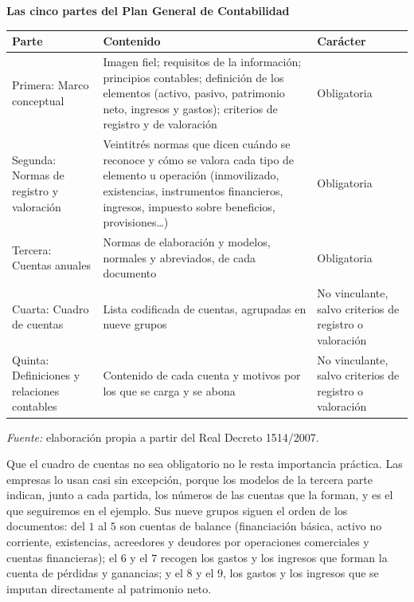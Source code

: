 \documentclass[10pt,a4paper]{article}
\begin{document}
\begin{center}\begin{minipage}{\linewidth}\centering
{\small\textbf{Las cinco partes del Plan General de Contabilidad}}\par\vspace{0.3em}
{\small
\begin{tabular}{p{2.6cm}p{9.2cm}p{2.9cm}}
\hline
\textbf{Parte} & \textbf{Contenido} & \textbf{Carácter} \\
\hline
\raggedright Primera: Marco conceptual & Imagen fiel; requisitos de la información; principios contables; definición de los elementos (activo, pasivo, patrimonio neto, ingresos y gastos); criterios de registro y de valoración & \raggedright Obligatoria \tabularnewline
\raggedright Segunda: Normas de registro y valoración & Veintitrés normas que dicen cuándo se reconoce y cómo se valora cada tipo de elemento u operación (inmovilizado, existencias, instrumentos financieros, ingresos, impuesto sobre beneficios, provisiones\ldots) & \raggedright Obligatoria \tabularnewline
\raggedright Tercera: Cuentas anuales & Normas de elaboración y modelos, normales y abreviados, de cada documento & \raggedright Obligatoria \tabularnewline
\raggedright Cuarta: Cuadro de cuentas & Lista codificada de cuentas, agrupadas en nueve grupos & \raggedright No vinculante, salvo criterios de registro o valoración \tabularnewline
\raggedright Quinta: Definiciones y relaciones contables & Contenido de cada cuenta y motivos por los que se carga y se abona & \raggedright No vinculante, salvo criterios de registro o valoración \tabularnewline
\hline
\end{tabular}}\par\vspace{0.3em}
{\small\textit{Fuente: }elaboración propia a partir del Real Decreto 1514/2007.}
\end{minipage}\end{center}

Que el cuadro de cuentas no sea obligatorio no le resta importancia práctica. Las empresas lo usan casi sin excepción, porque los modelos de la tercera parte indican, junto a cada partida, los números de las cuentas que la forman, y es el que seguiremos en el ejemplo. Sus nueve grupos siguen el orden de los documentos: del $1$ al $5$ son cuentas de balance (financiación básica, activo no corriente, existencias, acreedores y deudores por operaciones comerciales y cuentas financieras); el $6$ y el $7$ recogen los gastos y los ingresos que forman la cuenta de pérdidas y ganancias; y el $8$ y el $9$, los gastos y los ingresos que se imputan directamente al patrimonio neto.
\end{document}
